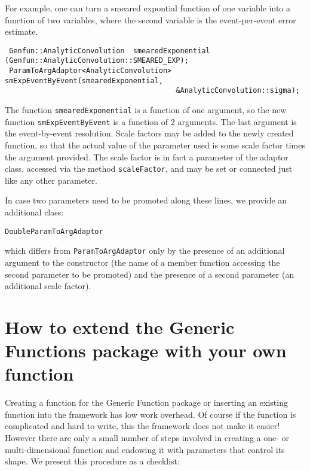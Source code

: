 \documentclass{report}
\begin{document}
	
For example, one can turn a smeared expontial function of one variable into a
function of two variables, where the second variable is the event-per-event 
error estimate.
\begin{verbatim}
 Genfun::AnalyticConvolution  smearedExponential (Genfun::AnalyticConvolution::SMEARED_EXP);
 ParamToArgAdaptor<AnalyticConvolution> smExpEventByEvent(smearedExponential,
                                        &AnalyticConvolution::sigma);	
\end{verbatim}
The function \verb+smearedExponential+ is a function of one argument,
so the new function \verb+smExpEventByEvent+ is a function of 2
arguments.  The last argument is the event-by-event resolution.  Scale
factors may be added to the newly created function, so that the actual
value of the parameter used is some scale factor times the argument
provided.  The scale factor is in fact a parameter of the adaptor
class, accessed via the method
\verb+scaleFactor+, and may be set or connected just like any other parameter.

In case two parameters need to be promoted along these lines, we provide an additional
class:
\begin{verbatim}
DoubleParamToArgAdaptor
\end{verbatim}
which differs from \verb+ParamToArgAdaptor+ only by
the presence of an additional argument to the constructor (the name of a member function
accessing the second parameter to be promoted) and the presence of a second parameter
(an additional scale factor).

\section {How to extend the Generic Functions package with your own function}

\noindent Creating a function for the Generic Function package or inserting an
existing function into the framework has low work overhead.  Of course
if the function is complicated and hard to write, this the framework
does not make it easier!  However there are only a small number of
steps involved in creating a one- or multi-dimensional function and
endowing it with parameters that control its shape.  We present this
procedure as a checklist:
\end{document}
